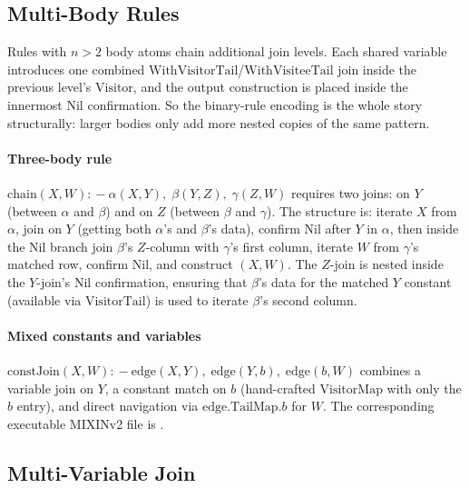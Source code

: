 \subsection{Multi-Body Rules}
\label{sec:encoding-multi}

Rules with $n > 2$ body atoms chain additional join levels.
Each shared variable introduces one combined
$\mathrm{WithVisitorTail}$/$\mathrm{WithVisiteeTail}$ join
inside the previous level's $\mathrm{Visitor}$,
and the output construction is placed inside the innermost
$\mathrm{Nil}$ confirmation.
So the binary-rule encoding is the whole story structurally:
larger bodies only add more nested copies of the same pattern.

\paragraph{Three-body rule}
$\mathrm{chain}(X, W) \mathrel{{:}\!{-}} \alpha(X, Y),\; \beta(Y, Z),\; \gamma(Z, W)$
requires two joins: on $Y$ (between $\alpha$ and $\beta$)
and on $Z$ (between $\beta$ and $\gamma$).
The structure is: iterate $X$ from $\alpha$, join on $Y$
(getting both $\alpha$'s and $\beta$'s data), confirm
$\mathrm{Nil}$ after $Y$ in $\alpha$, then inside the
$\mathrm{Nil}$ branch join $\beta$'s $Z$-column with
$\gamma$'s first column, iterate $W$ from $\gamma$'s
matched row, confirm $\mathrm{Nil}$, and construct
$(X, W)$.
The $Z$-join is nested inside the $Y$-join's
$\mathrm{Nil}$ confirmation, ensuring that $\beta$'s data
for the matched $Y$ constant (available via
$\mathrm{VisitorTail}$) is used to iterate $\beta$'s
second column.

\paragraph{Mixed constants and variables}
$\mathrm{constJoin}(X, W) \mathrel{{:}\!{-}} \mathrm{edge}(X, Y),\; \mathrm{edge}(Y, b),\; \mathrm{edge}(b, W)$
combines a variable join on $Y$, a constant match on $b$
(hand-crafted $\mathrm{VisitorMap}$ with only the $b$ entry),
and direct navigation via $\mathrm{edge}.\mathrm{TailMap}.b$
for $W$.
The corresponding executable MIXINv2 file is
.

\subsection{Multi-Variable Join}


